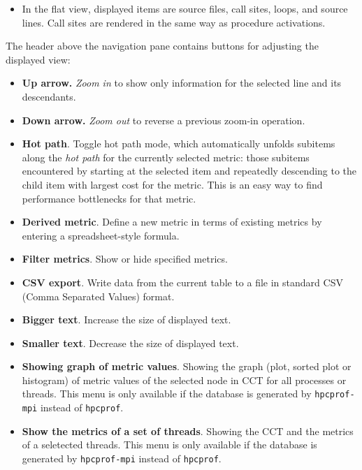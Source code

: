 \documentclass[english]{article}
\begin{document}
\begin{itemize}
\begin{itemize}
\item In the flat view, displayed items are
source files, call sites, loops, and source lines.
Call sites are rendered in the same way as procedure activations.

\end{itemize}

The header above the navigation pane contains buttons for adjusting the displayed view:

\begin{itemize}

\item \textbf{Up arrow.} \emph{Zoom in} to show only information for the selected line and its descendants.

\item \textbf{Down arrow.} \emph{Zoom out} to reverse a previous zoom-in operation.

\item \textbf{Hot path}. Toggle hot path mode,
which automatically unfolds subitems along the \emph{hot path} for the currently selected metric:
those subitems encountered by starting at the selected item
and repeatedly descending to the child item with largest cost for the metric.
This is an easy way to find performance bottlenecks for that metric.

\item \textbf{Derived metric}. Define a new metric in terms of existing metrics
by entering a spreadsheet-style formula.

\item \textbf{Filter metrics}. Show or hide specified metrics.

\item \textbf{CSV export}. Write data from the current table to a file
in standard CSV (Comma Separated Values) format.

\item \textbf{Bigger text}. Increase the size of displayed text.

\item \textbf{Smaller text}. Decrease the size of displayed text.

\item \textbf{Showing graph of metric values}.
Showing the graph (plot, sorted plot or histogram) of metric values of the selected node in CCT for all processes or threads.
This menu is only available if the database is generated by \texttt{hpcprof-mpi} instead of \texttt{hpcprof}. 

\item \textbf{Show the metrics of a set of threads}.
Showing the CCT and the metrics of a seletected threads.
This menu is only available if the database is generated by \texttt{hpcprof-mpi} instead of \texttt{hpcprof}. 
 



\end{itemize}
\end{itemize}
\end{document}
